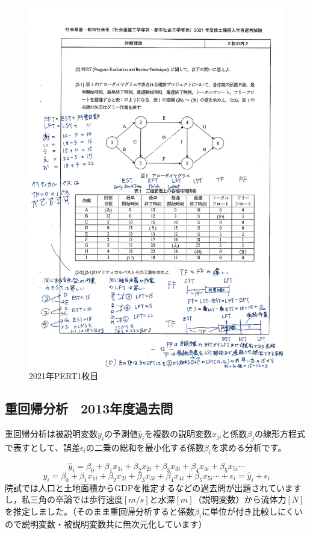 \documentclass{jsarticle}
\begin{document}
\begin{figure}[htbp]
  \includegraphics[keepaspectratio, width=16cm]{figures/pert20211.jpg}
  \caption{2021年PERT1枚目\label{pert20211}}
\end{figure}

\pagebreak

\subsection{重回帰分析　2013年度過去問\label{jyukaiki2013}}

重回帰分析は被説明変数$y_i$の予測値$\hat{y}_i$を複数の説明変数$x_{ji}$と係数$\beta_j$の線形方程式で表すとして、誤差$\epsilon_i$の二乗の総和を最小化する係数$\beta_i$を求める分析です。

$$\hat{y}_i=\beta_0+\beta_1 x_{1i}+\beta_2 x_{2i}+\beta_3 x_{3i}+\beta_4 x_{4i}+\beta_5 x_{5i}\cdots$$
$$y_i=\beta_0+\beta_1 x_{1i}+\beta_2 x_{2i}+\beta_3 x_{3i}+\beta_4 x_{4i}+\beta_5 x_{5i}\cdots+\epsilon_i=\hat{y}_i+\epsilon_i$$
院試では人口と土地面積からGDPを推定するなどの過去問が出題されていますし，私三角の卒論では歩行速度$[m/s]$と水深$[m]$（説明変数）から流体力$[N]$を推定しました。（そのまま重回帰分析すると係数$\beta_i$に単位が付き比較しにくいので説明変数・被説明変数共に無次元化しています）
\end{document}
